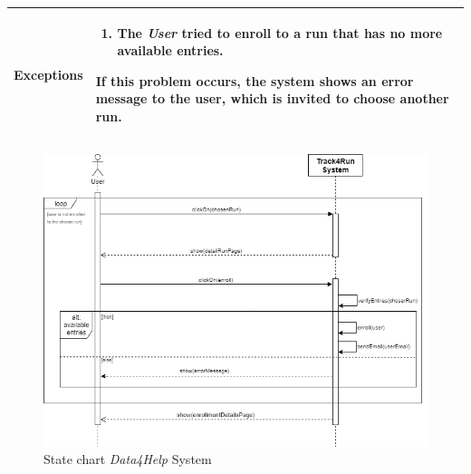 \begin{table}[H]
\begin{tabular}{|p{3.5cm}|p{10.3cm}|}
    \hline
    \textbf{\large{Exceptions}} 		& \begin{enumerate}[leftmargin=0.5cm]
                                          	\item The \emph{User} tried to enroll to a run that has no more available entries.
                                          \end{enumerate}
    										If this problem occurs, the system shows an error message to the user, which is invited to choose another run.\\
    
    \hline
    
    
    \end{tabular}
	
\end{table}

\begin{figure}[H]
    \centering
    \includegraphics[scale=0.4]{Pictures/enrollSeqDiag.png}
    \caption{State chart  \emph{Data4Help} System}
\end{figure}
